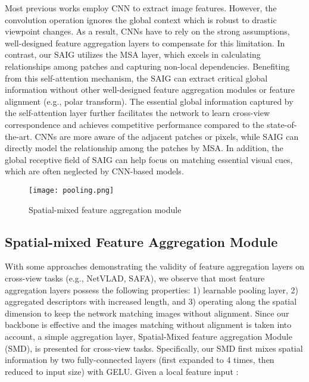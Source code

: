 \documentclass[sn-basic,iicol]{sn-jnl}
\theoremstyle{thmstyletwo}\newtheorem{example}{Example}\newtheorem{remark}{Remark}
\theoremstyle{thmstylethree}\newtheorem{definition}{Definition}
\begin{document}
 Most previous works employ CNN to extract image features. However, the convolution operation ignores the global context which is robust to drastic viewpoint changes. As a result, CNNs have to rely on the strong assumptions, well-designed feature aggregation layers to compensate for this limitation.
In contrast, our SAIG utilizes the MSA layer, which excels in calculating relationships among patches and capturing non-local dependencies. Benefiting from this self-attention mechanism, the SAIG can extract critical global information without other well-designed feature aggregation modules or feature alignment (e.g., polar transform). The essential global information captured by the self-attention layer further facilitates the network to learn cross-view correspondence and achieves competitive performance compared to the state-of-the-art. CNNs are more aware of the adjacent patches or pixels, while SAIG can directly model the relationship among the patches by MSA. In addition, the global receptive field of SAIG can help focus on matching essential visual cues, which are often neglected by CNN-based models.


\begin{figure}
\centering
\texttt{[image: pooling.png]}
\caption{Spatial-mixed feature aggregation module} 
\label{pool_layer}
\vspace{-12pt}
\end{figure}

\subsection{Spatial-mixed Feature Aggregation Module}
With some approaches demonstrating the validity of feature aggregation layers on cross-view tasks (e.g., NetVLAD, SAFA), we observe that most feature aggregation layers possess the following properties: 1) learnable pooling layer, 2) aggregated descriptors with increased length, and 3) operating along the spatial dimension to keep the network matching images without alignment. Since our backbone is effective and the images matching without alignment is taken into account, a simple aggregation layer, Spatial-Mixed feature aggregation Module (SMD), is presented for cross-view tasks. Specifically, our SMD first mixes spatial information by two fully-connected layers (first expanded to 4 times, then reduced to input size) with GELU. Given a local feature input :
\end{document}
